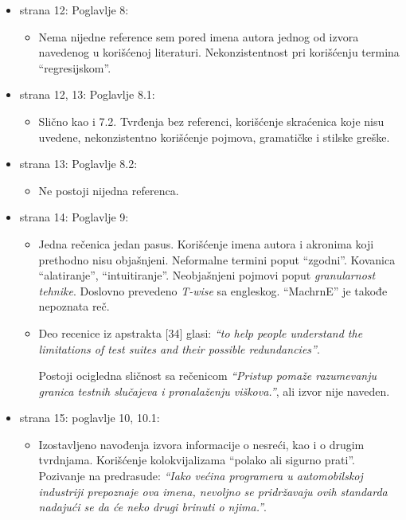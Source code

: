 \documentclass[a4paper]{report}
\begin{document}
\begin{itemize}
\item strana 12: Poglavlje 8:
  \begin{itemize}
  \item Nema nijedne reference sem pored imena autora jednog od izvora navedenog u korišćenoj literaturi. Nekonzistentnost pri korišćenju termina ``regresijskom''.
  \end{itemize}
\end{itemize}


\begin{itemize}
\item strana 12, 13: Poglavlje 8.1:
  \begin{itemize}
  \item Slično kao i 7.2. Tvrđenja bez referenci, korišćenje skraćenica koje nisu uvedene, nekonzistentno korišćenje pojmova, gramatičke i stilske greške.
  \end{itemize}
\end{itemize}


\begin{itemize}
\item strana 13: Poglavlje 8.2:
  \begin{itemize}
    \item Ne postoji nijedna referenca.
  \end{itemize}
\end{itemize}

\begin{itemize}
\item strana 14: Poglavlje 9:
  \begin{itemize}
  \item Jedna rečenica jedan pasus. Korišćenje imena autora i akronima koji prethodno nisu objašnjeni. Neformalne termini poput ``zgodni''. Kovanica ``alatiranje'', ``intuitiranje''. Neobjašnjeni pojmovi poput {\em{granularnost tehnike}}. Doslovno prevedeno {\em{T-wise}} sa engleskog. ``MachrnE'' je takođe nepoznata reč.
  \item Deo recenice iz apstrakta [34] glasi:
    {\em{``to help people understand the limitations of test suites   and their possible redundancies''}}.

    Postoji ocigledna sličnost sa rečenicom {\em{``Pristup pomaže razumevanju granica testnih slučajeva i pronalaženju viškova.''}}, ali izvor nije naveden.
  \end{itemize}
\end{itemize}

\begin{itemize}
\item strana 15: poglavlje 10, 10.1:
  \begin{itemize}
  \item Izostavljeno navođenja izvora informacije o nesreći, kao i o drugim tvrdnjama. Korišćenje kolokvijalizama ``polako ali sigurno prati''. Pozivanje na predrasude: {\em{``Iako većina programera u automobilskoj industriji prepoznaje ova imena, nevoljno se pridržavaju ovih standarda nadajući se da će neko drugi brinuti o njima.''}}.
  \end{itemize}
\end{itemize}
\end{document}
